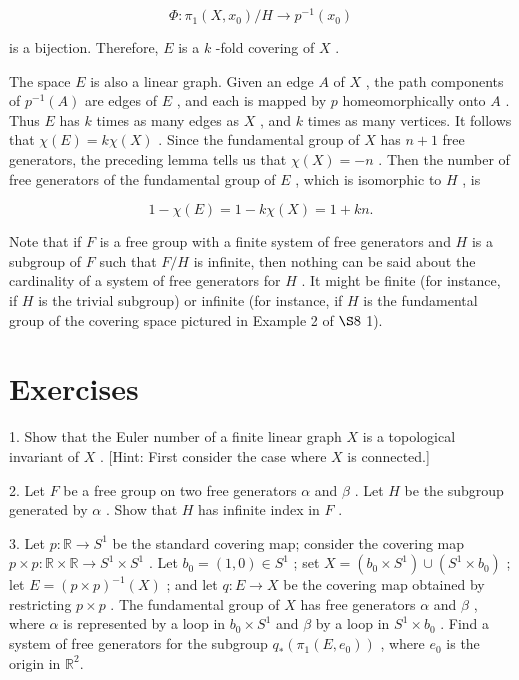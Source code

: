 \[
\Phi  : {\pi }_{1}\left( {X,{x}_{0}}\right) /H \rightarrow  {p}^{-1}\left( {x}_{0}\right)
\]

is a bijection. Therefore, \(E\) is a \(k\) -fold covering of \(X\) .

The space \(E\) is also a linear graph. Given an edge \(A\) of \(X\) , the path components of \({p}^{-1}\left( A\right)\) are edges of \(E\) , and each is mapped by \(p\) homeomorphically onto \(A\) . Thus \(E\) has \(k\) times as many edges as \(X\) , and \(k\) times as many vertices. It follows that \(\chi \left( E\right)  = {k\chi }\left( X\right)\) . Since the fundamental group of \(X\) has \(n + 1\) free generators, the preceding lemma tells us that \(\chi \left( X\right)  =  - n\) . Then the number of free generators of the fundamental group of \(E\) , which is isomorphic to \(H\) , is

\[
1 - \chi \left( E\right)  = 1 - {k\chi }\left( X\right)  = 1 + {kn}.
\]

Note that if \(F\) is a free group with a finite system of free generators and \(H\) is a subgroup of \(F\) such that \(F/H\) is infinite, then nothing can be said about the cardinality of a system of free generators for \(H\) . It might be finite (for instance, if \(H\) is the trivial subgroup) or infinite (for instance, if \(H\) is the fundamental group of the covering space pictured in Example 2 of \( \S 8\) 1).

\section*{Exercises}

1. Show that the Euler number of a finite linear graph \(X\) is a topological invariant of \(X\) . [Hint: First consider the case where \(X\) is connected.]

2. Let \(F\) be a free group on two free generators \(\alpha\) and \(\beta\) . Let \(H\) be the subgroup generated by \(\alpha\) . Show that \(H\) has infinite index in \(F\) .

3. Let \(p : \mathbb{R} \rightarrow  {S}^{1}\) be the standard covering map; consider the covering map \(p \times  p : \mathbb{R} \times  \mathbb{R} \rightarrow  {S}^{1} \times  {S}^{1}\) . Let \({b}_{0} = \left( {1,0}\right)  \in  {S}^{1}\) ; set \(X = \left( {{b}_{0} \times  {S}^{1}}\right)  \cup  \left( {{S}^{1} \times  {b}_{0}}\right)\) ; let \(E = {\left( p \times  p\right) }^{-1}\left( X\right)\) ; and let \(q : E \rightarrow  X\) be the covering map obtained by restricting \(p \times  p\) . The fundamental group of \(X\) has free generators \(\alpha\) and \(\beta\) , where \(\alpha\) is represented by a loop in \({b}_{0} \times  {S}^{1}\) and \(\beta\) by a loop in \({S}^{1} \times  {b}_{0}\) . Find a system of free generators for the subgroup \({q}_{ * }\left( {{\pi }_{1}\left( {E,{e}_{0}}\right) }\right)\) , where \({e}_{0}\) is the origin in \({\mathbb{R}}^{2}\).